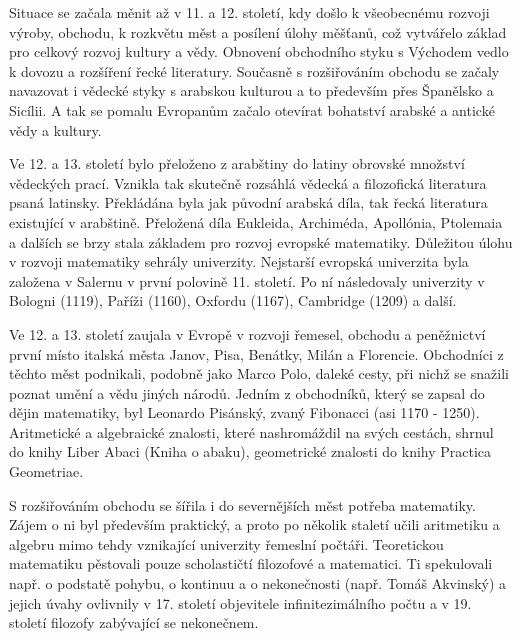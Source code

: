       Situace se začala měnit až v 11. a 12. století, kdy došlo k všeobecnému rozvoji výroby,
      obchodu, k rozkvětu měst a posílení úlohy měšťanů, což vytvářelo základ pro celkový rozvoj
      kultury a vědy. Obnovení obchodního styku s Východem vedlo k dovozu a rozšíření řecké
      literatury. Současně s rozšiřováním obchodu se začaly navazovat i vědecké styky s arabskou
      kulturou a to především přes Španělsko a Sicílii. A tak se pomalu Evropanům začalo otevírat
      bohatství arabské a antické vědy a kultury.
      
      Ve 12. a 13. století bylo přeloženo z arabštiny do latiny obrovské množství vědeckých prací.
      Vznikla tak skutečně rozsáhlá vědecká a filozofická literatura psaná latinsky. Překládána byla
      jak původní arabská díla, tak řecká literatura existující v arabštině. Přeložená díla
      Eukleida, Archiméda, Apollónia, Ptolemaia a dalších se brzy stala základem pro rozvoj evropské
      matematiky. Důležitou úlohu v rozvoji matematiky sehrály univerzity. Nejstarší evropská
      univerzita byla založena v Salernu v první polovině 11. století. Po ní následovaly univerzity
      v Bologni (1119), Paříži (1160), Oxfordu (1167), Cambridge (1209) a další.

      Ve 12. a 13. století zaujala v Evropě v rozvoji řemesel, obchodu a peněžnictví první místo
      italská města Janov, Pisa, Benátky, Milán a Florencie. Obchodníci z těchto měst podnikali,
      podobně jako Marco Polo, daleké cesty, při nichž se snažili poznat umění a vědu jiných národů.
      Jedním z obchodníků, který se zapsal do dějin matematiky, byl Leonardo Pisánský, zvaný
      Fibonacci (asi 1170 - 1250). Aritmetické a algebraické znalosti, které nashromáždil na svých
      cestách, shrnul do knihy Liber Abaci (Kniha o abaku), geometrické znalosti do knihy Practica
      Geometriae.

      S rozšiřováním obchodu se šířila i do severnějších měst potřeba matematiky. Zájem o ni byl
      především praktický, a proto po několik staletí učili aritmetiku a algebru mimo tehdy
      vznikající univerzity řemeslní počtáři. Teoretickou matematiku pěstovali pouze scholastičtí
      filozofové a matematici. Ti spekulovali např. o podstatě pohybu, o kontinuu a o nekonečnosti
      (např. Tomáš Akvinský) a jejich úvahy ovlivnily v 17. století objevitele infinitezimálního
      počtu a v 19. století filozofy zabývající se nekonečnem.

